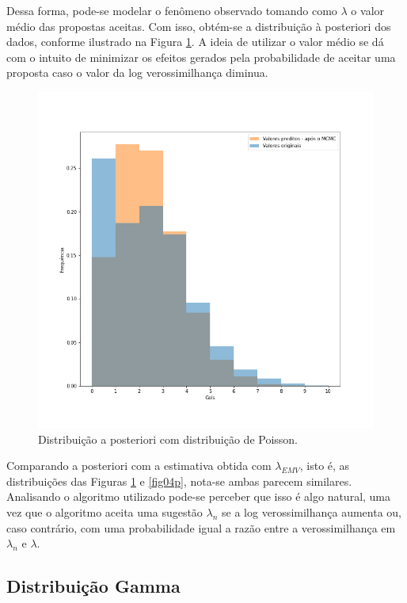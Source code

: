 \documentclass[11pt,letterpaper,twocolumn]{article}
\begin{document}
Dessa forma, pode-se modelar o fenômeno observado tomando como $\lambda$ o valor médio das propostas aceitas. Com isso, obtém-se a distribuição à posteriori dos dados, conforme ilustrado na Figura \ref{fig08p}. A ideia de utilizar o valor médio se dá com o intuito de minimizar os efeitos gerados pela probabilidade de aceitar uma proposta caso o valor da log verossimilhança diminua.
\begin{figure}[hbt]
    \centering
    \includegraphics[scale = 0.40, center]{Poisson/fig08 - poisson.png}
    \caption{Distribuição a posteriori com distribuição de Poisson.}
    \label{fig08p}
\end{figure}

Comparando a posteriori com a estimativa obtida com $\lambda_{EMV}$, isto é, as distribuições das Figuras \ref{fig08p} e \ref{fig04p}, nota-se ambas parecem similares. Analisando o algoritmo utilizado pode-se perceber que isso é algo natural, uma vez que o algoritmo aceita uma sugestão $\lambda_n$ se a log verossimilhança aumenta ou, caso contrário, com uma probabilidade igual a razão entre a verossimilhança em $\lambda_n$ e $\lambda$.

\subsection{Distribuição Gamma}
\justify
\end{document}
